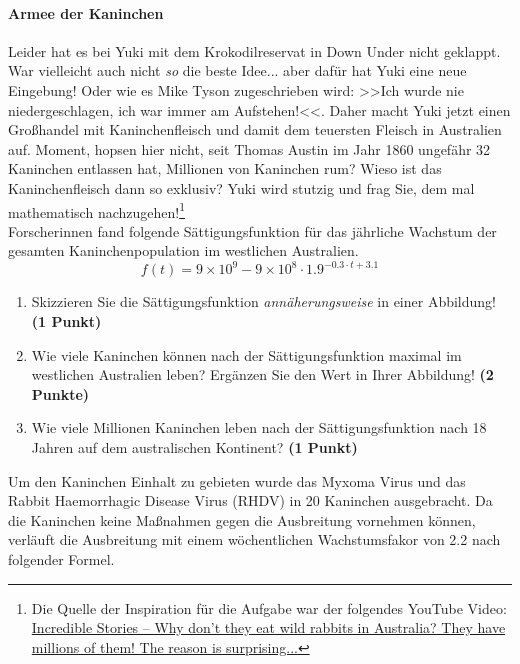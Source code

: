 \documentclass[a4paper, 9pt]{scrartcl}\usepackage[]{graphicx}\usepackage[]{xcolor}
\begin{document}
\paragraph{Armee der Kaninchen}



Leider hat es bei Yuki mit dem Krokodilreservat in Down Under nicht geklappt. War vielleicht auch nicht \textit{so} die beste Idee... aber dafür hat Yuki eine neue Eingebung! Oder wie es Mike Tyson zugeschrieben wird: >>Ich wurde nie niedergeschlagen, ich war immer am Aufstehen!<<. Daher macht Yuki jetzt einen Großhandel mit Kaninchenfleisch und damit dem teuersten Fleisch in Australien auf. Moment, hopsen hier nicht, seit Thomas Austin im Jahr 1860 ungefähr 32 Kaninchen entlassen hat, Millionen von Kaninchen rum? Wieso ist das Kaninchenfleisch dann so exklusiv? Yuki wird stutzig und frag Sie, dem mal mathematisch nachzugehen!\footnote{Die Quelle der Inspiration für die Aufgabe war der folgendes YouTube Video: \href{https://youtu.be/38fuOr3tdgc?si=Li7NL_FoByML8JtT}{ Incredible Stories -- Why don't they eat wild rabbits in Australia? They have    millions of them! The reason is surprising...}} \\

Forscherinnen fand folgende Sättigungsfunktion für das jährliche Wachstum der gesamten Kaninchenpopulation im westlichen Australien.
\begin{equation*}
  f(t) = \ensuremath{9\times 10^{9}} - \ensuremath{9\times 10^{8}} \cdot 1.9^{-0.3 \cdot t + 3.1}
\end{equation*}

\begin{enumerate}
\item Skizzieren Sie die Sättigungsfunktion \textit{annäherungsweise} in einer Abbildung! \textbf{(1 Punkt)}
\item Wie viele Kaninchen können nach der Sättigungsfunktion maximal im westlichen Australien leben? Ergänzen Sie den Wert in Ihrer Abbildung! \textbf{(2 Punkte)}
\item Wie viele Millionen Kaninchen leben nach der Sättigungsfunktion nach 18 Jahren auf dem australischen Kontinent? \textbf{(1 Punkt)}
\end{enumerate}

Um den Kaninchen Einhalt zu gebieten wurde das Myxoma Virus und das Rabbit Haemorrhagic Disease Virus (RHDV) in 20 Kaninchen ausgebracht. Da die Kaninchen keine Maßnahmen gegen die Ausbreitung vornehmen können, verläuft die Ausbreitung mit einem wöchentlichen Wachstumsfakor von 2.2 nach folgender Formel.
\end{document}
